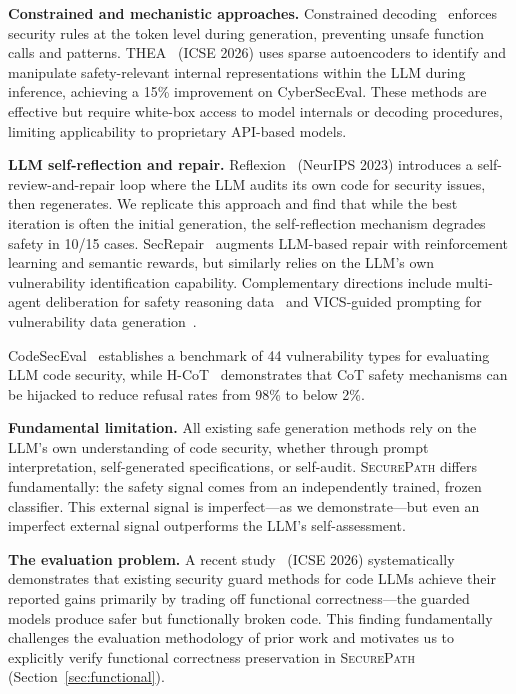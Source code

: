 \documentclass[sigconf,10pt]{acmart}
\begin{document}
\textbf{Constrained and mechanistic approaches.} Constrained decoding~\cite{constraineddecode} enforces security rules at the token level during generation, preventing unsafe function calls and patterns. THEA~\cite{thea} (ICSE 2026) uses sparse autoencoders to identify and manipulate safety-relevant internal representations within the LLM during inference, achieving a 15\% improvement on CyberSecEval. These methods are effective but require white-box access to model internals or decoding procedures, limiting applicability to proprietary API-based models.

\textbf{LLM self-reflection and repair.} Reflexion~\cite{reflexion} (NeurIPS 2023) introduces a self-review-and-repair loop where the LLM audits its own code for security issues, then regenerates. We replicate this approach and find that while the best iteration is often the initial generation, the self-reflection mechanism degrades safety in 10/15 cases. SecRepair~\cite{secrepair} augments LLM-based repair with reinforcement learning and semantic rewards, but similarly relies on the LLM's own vulnerability identification capability. Complementary directions include multi-agent deliberation for safety reasoning data~\cite{aidsafe} and VICS-guided prompting for vulnerability data generation~\cite{vics}.

CodeSecEval~\cite{codesec} establishes a benchmark of 44 vulnerability types for evaluating LLM code security, while H-CoT~\cite{hcot} demonstrates that CoT safety mechanisms can be hijacked to reduce refusal rates from 98\% to below 2\%.

\textbf{Fundamental limitation.} All existing safe generation methods rely on the LLM's own understanding of code security, whether through prompt interpretation, self-generated specifications, or self-audit. \textsc{SecurePath} differs fundamentally: the safety signal comes from an independently trained, frozen classifier. This external signal is imperfect---as we demonstrate---but even an imperfect external signal outperforms the LLM's self-assessment.

\textbf{The evaluation problem.} A recent study~\cite{rethinking} (ICSE 2026) systematically demonstrates that existing security guard methods for code LLMs achieve their reported gains primarily by trading off functional correctness---the guarded models produce safer but functionally broken code. This finding fundamentally challenges the evaluation methodology of prior work and motivates us to explicitly verify functional correctness preservation in \textsc{SecurePath} (Section~\ref{sec:functional}).
\end{document}
